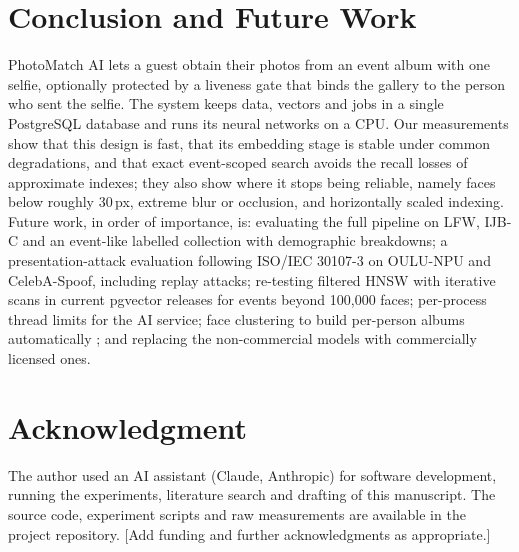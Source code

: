 \documentclass[conference]{IEEEtran}
\begin{document}
\section{Conclusion and Future Work}\label{sec:conclusion}
PhotoMatch AI lets a guest obtain their photos from an event album with one selfie, optionally protected by a liveness gate that binds the gallery to the person who sent the selfie. The system keeps data, vectors and jobs in a single PostgreSQL database and runs its neural networks on a CPU. Our measurements show that this design is fast, that its embedding stage is stable under common degradations, and that exact event-scoped search avoids the recall losses of approximate indexes; they also show where it stops being reliable, namely faces below roughly 30\,px, extreme blur or occlusion, and horizontally scaled indexing. Future work, in order of importance, is: evaluating the full pipeline on LFW, IJB-C and an event-like labelled collection with demographic breakdowns; a presentation-attack evaluation following ISO/IEC 30107-3 on OULU-NPU and CelebA-Spoof, including replay attacks; re-testing filtered HNSW with iterative scans in current pgvector releases for events beyond 100,000 faces; per-process thread limits for the AI service; face clustering to build per-person albums automatically \cite{wang2019linkage}; and replacing the non-commercial models with commercially licensed ones.

\section*{Acknowledgment}
The author used an AI assistant (Claude, Anthropic) for software development, running the experiments, literature search and drafting of this manuscript. The source code, experiment scripts and raw measurements are available in the project repository. [Add funding and further acknowledgments as appropriate.]



\end{document}
